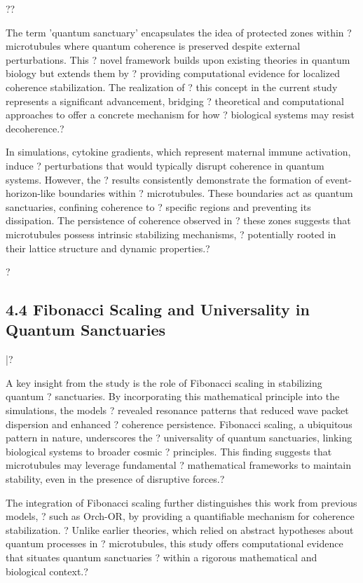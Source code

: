 ??

The term 'quantum sanctuary' encapsulates the idea of protected zones within ?
microtubules where quantum coherence is preserved despite external perturbations. This ?
novel framework builds upon existing theories in quantum biology but extends them by ?
providing computational evidence for localized coherence stabilization. The realization of ?
this concept in the current study represents a significant advancement, bridging ?
theoretical and computational approaches to offer a concrete mechanism for how ?
biological systems may resist decoherence.?

In simulations, cytokine gradients, which represent maternal immune activation, induce ?
perturbations that would typically disrupt coherence in quantum systems. However, the ?
results consistently demonstrate the formation of event-horizon-like boundaries within ?
microtubules. These boundaries act as quantum sanctuaries, confining coherence to ?
specific regions and preventing its dissipation. The persistence of coherence observed in ?
these zones suggests that microtubules possess intrinsic stabilizing mechanisms, ?
potentially rooted in their lattice structure and dynamic properties.?

?\subsection{4.4 Fibonacci Scaling and Universality in Quantum Sanctuaries}|?

A key insight from the study is the role of Fibonacci scaling in stabilizing quantum ?
sanctuaries. By incorporating this mathematical principle into the simulations, the models ?
revealed resonance patterns that reduced wave packet dispersion and enhanced ?
coherence persistence. Fibonacci scaling, a ubiquitous pattern in nature, underscores the ?
universality of quantum sanctuaries, linking biological systems to broader cosmic ?
principles. This finding suggests that microtubules may leverage fundamental ?
mathematical frameworks to maintain stability, even in the presence of disruptive forces.?

The integration of Fibonacci scaling further distinguishes this work from previous models, ?
such as Orch-OR, by providing a quantifiable mechanism for coherence stabilization. ?
Unlike earlier theories, which relied on abstract hypotheses about quantum processes in ?
microtubules, this study offers computational evidence that situates quantum sanctuaries ?
within a rigorous mathematical and biological context.?

